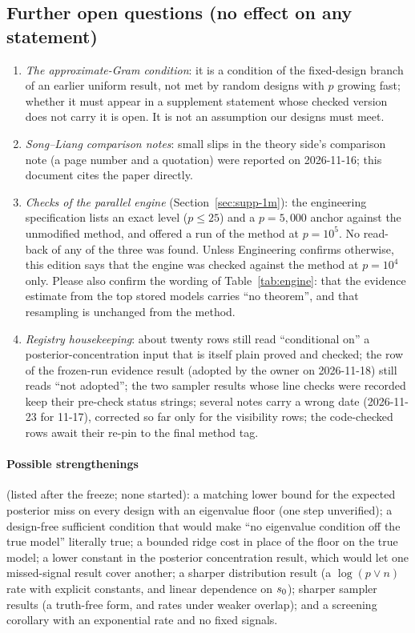 \subsection*{Further open questions (no effect on any statement)}\label{app:status-open}
\begin{enumerate}[leftmargin=1.6em,itemsep=1pt]
  \item \emph{The approximate-Gram condition}: it is a condition of the fixed-design branch of an earlier uniform result,
    not met by random designs with $p$ growing fast; whether it must appear in a supplement statement whose checked version
    does not carry it is open. It is not an assumption our designs must meet.
  \item \emph{Song--Liang comparison notes}: small slips in the theory side's comparison note (a page number and a
    quotation) were reported on 2026-11-16; this document cites the paper directly.
  \item \emph{Checks of the parallel engine} (Section~\ref{sec:supp-1m}): the engineering specification lists an exact
    level ($p\le25$) and a $p=5{,}000$ anchor against the unmodified method, and offered a run of the method at $p=10^5$.
    No read-back of any of the three was found. Unless Engineering confirms otherwise, this edition says that the engine was
    checked against the method at $p=10^4$ only. Please also confirm the wording of Table~\ref{tab:engine}: that the
    evidence estimate from the top stored models carries ``no theorem'', and that resampling is unchanged from the method.
  \item \emph{Registry housekeeping}: about twenty rows still read ``conditional on'' a posterior-concentration input that
    is itself plain proved and checked; the row of the frozen-run evidence result (adopted by the owner on 2026-11-18)
    still reads ``not adopted''; the two sampler results whose line checks were recorded keep their pre-check status
    strings; several notes carry a wrong date (2026-11-23 for 11-17), corrected so far only for the visibility rows; the
    code-checked rows await their re-pin to the final method tag.
\end{enumerate}

\paragraph{Possible strengthenings} (listed after the freeze; none started): a matching lower bound for the expected
posterior miss on every design with an eigenvalue floor (one step unverified); a design-free sufficient condition that
would make ``no eigenvalue condition off the true model'' literally true; a bounded ridge cost in place of the floor on the
true model; a lower constant in the posterior concentration result, which would let one missed-signal result cover another;
a sharper distribution result (a $\log(p\vee n)$ rate with explicit constants, and linear dependence on $s_0$); sharper
sampler results (a truth-free form, and rates under weaker overlap); and a screening corollary with an exponential rate and
no fixed signals.

